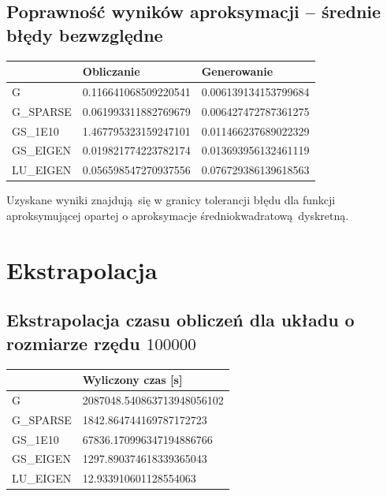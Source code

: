 \documentclass[10pt]{article}
\newenvironment{corollary}[2][Wniosek]{\begin{trivlist}
\item[\hskip \labelsep {\bfseries #1}\hskip \labelsep {\bfseries #2.}]}{\end{trivlist}}
\begin{document}
\subsection{Poprawność wyników aproksymacji – średnie błędy bezwzględne}
\begin{center}
		\begin{tabular}{|C{2.5cm}| C{5cm}|C{5cm}|}
			\hline
			\textbf{} & \textbf{Obliczanie} & \textbf{Generowanie} \\ \hline
			{G} & 0.116641068509220541 & 0.006139134153799684  \\ \hline
			{G\_SPARSE} & 0.061993311882769679 & 0.006427472787361275 \\  \hline
			{GS\_1E10} & 1.467795323159247101 & 0.011466237689022329 \\  \hline
			{GS\_EIGEN} & 0.019821774223782174 & 0.013693956132461119\\ \hline
			{LU\_EIGEN} & 0.056598547270937556 & 0.076729386139618563\\ \hline
		\end{tabular}
\end{center}
\begin{corollary}{1}
	Uzyskane wyniki znajdują się w granicy tolerancji błędu dla funkcji aproksymującej opartej o aproksymacje średniokwadratową dyskretną.

\end{corollary}

\section{Ekstrapolacja}
\subsection{Ekstrapolacja czasu obliczeń dla układu o rozmiarze rzędu $100 000$}
\begin{center}
	\begin{tabular}{|C{2.5cm}|C{5cm}|}
		\hline
		\textbf{} & \textbf{Wyliczony czas [s]}\\ \hline
		{G} & 2087048.540863713948056102 \\ \hline
		{G\_SPARSE} & 1842.864744169787172723 \\  \hline
		{GS\_1E10} & 67836.170996347194886766 \\  \hline
		{GS\_EIGEN} & 1297.890374618339365043 \\ \hline
		{LU\_EIGEN} & 12.933910601128554063 \\ \hline
	\end{tabular}
\end{center}
	
\end{document}
